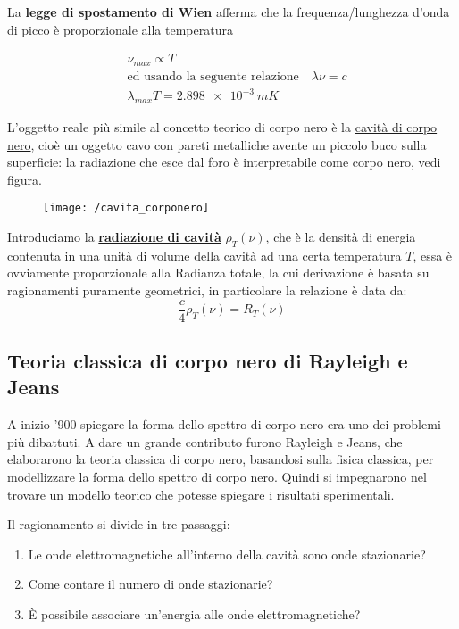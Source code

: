 La \textbf{legge di spostamento di Wien} afferma che la frequenza/lunghezza d'onda di picco è proporzionale alla temperatura

\begin{equation}
\begin{split}
& \nu_{max} \propto T \\
& \mbox{ed usando la seguente relazione} \quad \lambda\nu = c \\
& \lambda_{max}T = \SI{2.898e-3}{mK}
\end{split}
\end{equation}

L'oggetto reale più simile al concetto teorico di corpo nero è la \underline{cavità di corpo nero}, cioè un oggetto cavo con pareti metalliche avente un piccolo buco sulla superficie: la radiazione che esce dal foro è interpretabile come corpo nero, vedi figura.

\begin{figure}[h]
\centering
\texttt{[image: /cavita\_corponero]}
\end{figure}

Introduciamo la \underline{\textbf{radiazione di cavità}} $\rho_T(\nu)$, che è la densità di energia contenuta in una unità di volume della cavità ad una certa temperatura $T$,
essa è ovviamente proporzionale alla Radianza totale, la cui derivazione è basata su ragionamenti puramente geometrici, in particolare la relazione è data da:
\begin{equation}
\frac{c}{4}\rho_T(\nu)=R_T(\nu)
\end{equation}

\subsection{Teoria classica di corpo nero di Rayleigh e Jeans}

A inizio '900 spiegare la forma dello spettro di corpo nero era uno dei problemi più dibattuti.
A dare un grande contributo furono Rayleigh e Jeans, che elaborarono la teoria classica di corpo nero, basandosi sulla fisica classica, per modellizzare la forma dello spettro di corpo nero.
Quindi si impegnarono nel trovare un modello teorico che potesse spiegare i risultati sperimentali.

Il ragionamento si divide in tre passaggi:
\begin{enumerate}[label=\Roman{*}.]
\item Le onde elettromagnetiche all'interno della cavità sono onde stazionarie?
\item Come contare il numero di onde stazionarie?
\item È possibile associare un'energia alle onde elettromagnetiche?
\end{enumerate}


